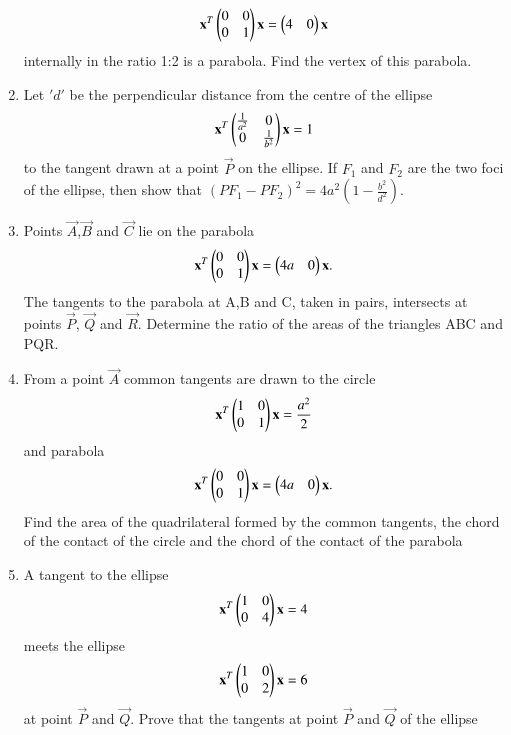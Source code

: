 \begin{enumerate}[label=\arabic*.,ref=\thesubsection.\theenumi]
    \begin{align}
    \mathbf{x}^T\begin{pmatrix}0&0\\0&1\end{pmatrix}\mathbf{x}=\begin{pmatrix}4&0\end{pmatrix}\mathbf{x}
    \end{align} internally in the ratio 1:2 is a parabola. Find the vertex of this parabola.
    \item Let $'d'$ be the perpendicular distance from the centre of the ellipse
    \begin{align}
    \mathbf{x}^T\begin{pmatrix}\frac{1}{a^2}&0\\0&\frac{1}{b^2}\end{pmatrix}\mathbf{x}=1
    \end{align} to the tangent drawn at a point $\vec{P}$ on the ellipse. If $F_1$ and $F_2$ are the 		two foci of the ellipse, then show that $(PF_1-PF_2)^2=4a^2(1-\frac{b^2}{d^2})$.
    \item Points $\vec{A}$,$\vec{B}$ and $\vec{C}$ lie on the parabola 
    \begin{align}
    \mathbf{x}^T\begin{pmatrix}0&0\\0&1\end{pmatrix}\mathbf{x}=\begin{pmatrix}4a&0\end{pmatrix}\mathbf{x}.
    \end{align} The tangents to the parabola at A,B and C, taken in pairs, intersects at points   
    $\vec{P}$, $\vec{Q}$ and $\vec{R}$. Determine the ratio of the areas of the triangles ABC and 			PQR.
    \item From a point $\vec{A}$ common tangents are drawn to the circle 
    \begin{align}
    \mathbf{x}^T\begin{pmatrix}1&0\\0&1\end{pmatrix}\mathbf{x}=\frac{a^2}{2}
    \end{align} and parabola 
    \begin{align}
    \mathbf{x}^T\begin{pmatrix}0&0\\0&1\end{pmatrix}\mathbf{x}=\begin{pmatrix}4a&0\end{pmatrix}\mathbf{x}.
    \end{align} Find the area of the quadrilateral formed by the common tangents, the chord of the contact of the circle and the chord of the contact of the parabola
    \item A tangent to the ellipse 
    \begin{align}
    \mathbf{x}^T\begin{pmatrix}1&0\\0&4\end{pmatrix}\mathbf{x}=4
    \end{align} meets the ellipse 
    \begin{align}
    \mathbf{x}^T\begin{pmatrix}1&0\\0&2\end{pmatrix}\mathbf{x}=6 
    \end{align} at point $\vec{P}$ and $\vec{Q}$. Prove that the tangents at point $\vec{P}$ and 
    $\vec{Q}$ of the ellipse
    \begin{align}

\end{align}
\end{enumerate}
